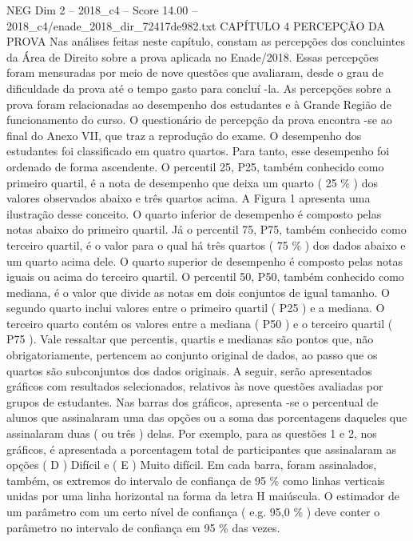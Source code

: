 \begin{textsample}{NEG Dim 2 – 2018\_c4 – Score 14.00 – 2018\_c4/enade\_2018\_dir\_72417de982.txt}  \label{ex:f2_neg_376}
CAPÍTULO 4 PERCEPÇÃO DA PROVA Nas análises feitas neste capítulo, constam as percepções dos concluintes da Área de Direito sobre a prova aplicada no Enade/2018.
Essas percepções foram mensuradas por meio de nove questões que avaliaram, desde o grau de dificuldade da prova até o tempo gasto para concluí -la.
As percepções sobre a prova foram relacionadas ao desempenho dos estudantes e à Grande Região de funcionamento do curso.
O questionário de percepção da prova encontra -se ao final do Anexo VII, que traz a reprodução do exame.
O desempenho dos estudantes foi classificado em quatro quartos.
Para tanto, esse desempenho foi ordenado de forma ascendente.
O percentil 25, P25, também conhecido como primeiro quartil, é a nota de desempenho que deixa um quarto ( 25 \% ) dos valores observados abaixo e três quartos acima.
A Figura 1 apresenta uma ilustração desse conceito.
O quarto inferior de desempenho é composto pelas notas abaixo do primeiro quartil.
Já o percentil 75, P75, também conhecido como terceiro quartil, é o valor para o qual há três quartos ( 75 \% ) dos dados abaixo e um quarto acima dele.
O quarto superior de desempenho é composto pelas notas iguais ou acima do terceiro quartil.
O percentil 50, P50, também conhecido como mediana, é o valor que divide as notas em dois conjuntos de igual tamanho.
O segundo quarto inclui valores entre o primeiro quartil ( P25 ) e a mediana.
O terceiro quarto contém os valores entre a mediana ( P50 ) e o terceiro quartil ( P75 ).
Vale ressaltar que percentis, quartis e medianas são pontos que, não obrigatoriamente, pertencem ao conjunto original de dados, ao passo que os quartos são subconjuntos dos dados originais.
A seguir, serão apresentados gráficos com resultados selecionados, relativos às nove questões avaliadas por grupos de estudantes.
Nas barras dos gráficos, apresenta -se o percentual de alunos que assinalaram uma das opções ou a soma das porcentagens daqueles que assinalaram duas ( ou três ) delas.
Por exemplo, para as questões 1 e 2, nos gráficos, é apresentada a porcentagem total de participantes que assinalaram as opções ( D ) Difícil e ( E ) Muito difícil.
Em cada barra, foram assinalados, também, os extremos do intervalo de confiança de 95 \% como linhas verticais unidas por uma linha horizontal na forma da letra H maiúscula.
O estimador de um parâmetro com um certo nível de confiança ( e.g. 95,0 \% ) deve conter o parâmetro no intervalo de confiança em 95 \% das vezes.

\end{textsample}
